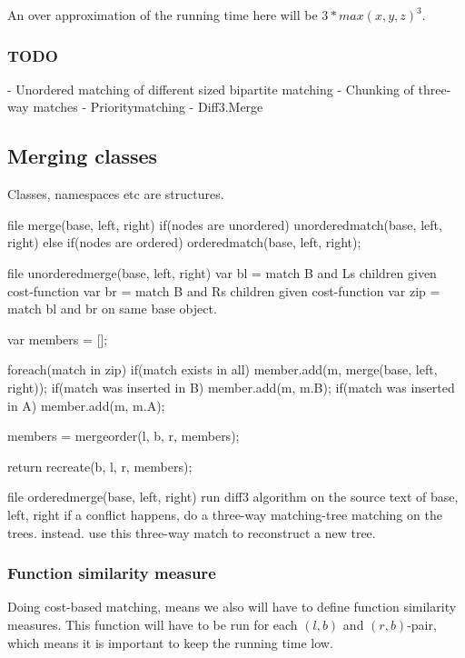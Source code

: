 \documentclass[11pt]{article}
\begin{document}

An over approximation of the running time here will be  $3*max(x, y, z)^3$.

\subsubsection{TODO}

- Unordered matching of different sized bipartite matching
- Chunking of three-way matches
- Prioritymatching
- Diff3.Merge

\subsection{Merging classes}
Classes, namespaces etc are structures.

file merge(base, left, right)
    if(nodes are unordered)
        unorderedmatch(base, left, right)
    else if(nodes are ordered)
        orderedmatch(base, left, right);

file unorderedmerge(base, left, right)
    var bl = match B and Ls children given cost-function
    var br = match B and Rs children given cost-function
    var zip = match bl and br on same base object.

    var members = [];

    foreach(match in zip)
        if(match exists in all)
            member.add(m, merge(base, left, right));
        if(match was inserted in B)
            member.add(m, m.B);
        if(match was inserted in A)
            member.add(m, m.A);
    
    members = mergeorder(l, b, r, members);

    return recreate(b, l, r, members);
    

file orderedmerge(base, left, right)
    run diff3 algorithm on the source text of base, left, right
    if a conflict happens, do a three-way matching-tree matching on the trees. instead.
    use this three-way match to reconstruct a new tree.



\subsubsection{Function similarity measure}
Doing cost-based matching, means we also will have to define function similarity measures. This function will have to be run for each $(l, b)$ and $(r, b)$-pair, which means it is important to keep the running time low.
\end{document}
